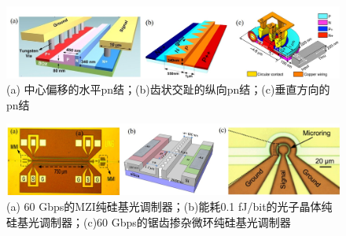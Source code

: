 \begin{figure}[htb]
	\centering
	\includegraphics[width=15cm]{./Pictures/fig_silicon_mod_cross.jpg}
	\caption{ (a) 中心偏移的水平pn结\cite{xiao2013high}；(b)齿状交趾的纵向pn结\cite{Xiao201360}；(c)垂直方向的pn结\cite{timurdogan2014ultralow}}
	\label{fig_silicon_mod_cross}
\end{figure}

\begin{figure}[htb]
	\centering
	\includegraphics[width=15cm]{./Pictures/fig_silicon_mod.jpg}
	\caption{ (a) 60 Gbps的MZI纯硅基光调制器\cite{Xiao201360}；(b)能耗0.1 fJ/bit的光子晶体纯硅基光调制器\cite{shakoor2014ultra}；(c)60 Gbps的锯齿掺杂微环纯硅基光调制器\cite{Xiao201360}}
	\label{fig_silicon_mod}
\end{figure}
